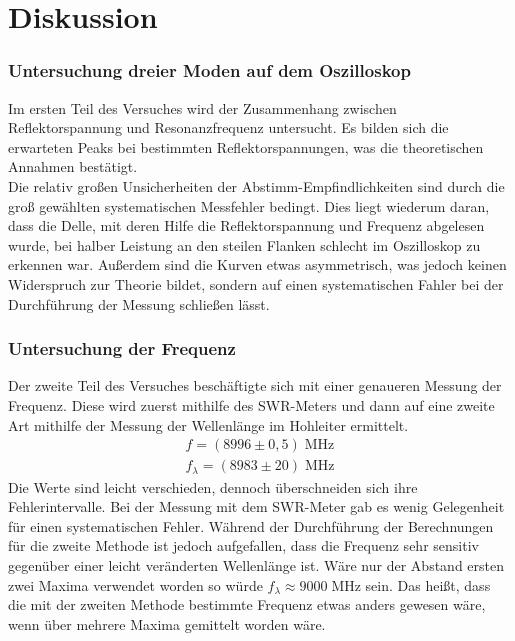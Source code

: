 \newpage
\section{Diskussion}
\label{sec:diskussion}
    \subsubsection*{Untersuchung dreier Moden auf dem Oszilloskop}
        Im ersten Teil des Versuches wird der Zusammenhang zwischen Reflektorspannung und Resonanzfrequenz untersucht.
        Es bilden sich die erwarteten Peaks bei bestimmten Reflektorspannungen, was die theoretischen Annahmen bestätigt. \\
        Die relativ großen Unsicherheiten der Abstimm-Empfindlichkeiten sind durch die groß gewählten systematischen Messfehler bedingt.
        Dies liegt wiederum daran, dass die Delle, mit deren Hilfe die Reflektorspannung und Frequenz abgelesen wurde, bei halber Leistung an den steilen Flanken schlecht im Oszilloskop zu erkennen war.
        Außerdem sind die Kurven etwas asymmetrisch, was jedoch keinen Widerspruch zur Theorie bildet, sondern auf einen systematischen Fahler bei der Durchführung der Messung schließen lässt.

    \subsubsection*{Untersuchung der Frequenz}
        Der zweite Teil des Versuches beschäftigte sich mit einer genaueren Messung der Frequenz.
        Diese wird zuerst mithilfe des SWR-Meters und dann auf eine zweite Art mithilfe der Messung der Wellenlänge im Hohleiter ermittelt.
        \begin{align*}
            f = (8996 \pm 0,5) \; \mathrm{MHz} \\
            f_{\lambda} = (8983 \pm 20) \; \mathrm{MHz}
        \end{align*}
        Die Werte sind leicht verschieden, dennoch überschneiden sich ihre Fehlerintervalle.
        Bei der Messung mit dem SWR-Meter gab es wenig Gelegenheit für einen systematischen Fehler.
        Während der Durchführung der Berechnungen für die zweite Methode ist jedoch aufgefallen, dass die Frequenz sehr sensitiv gegenüber einer leicht veränderten Wellenlänge ist. Wäre nur der Abstand ersten zwei Maxima verwendet worden so würde $f_{\lambda} \approx 9000\;$MHz sein. Das heißt, dass die mit der zweiten Methode bestimmte Frequenz etwas anders gewesen wäre, wenn über mehrere Maxima gemittelt worden wäre. 

